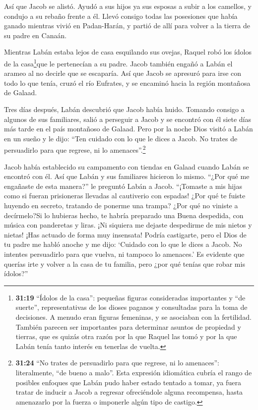  Así que Jacob se alistó. Ayudó a sus hijos ya sus esposas
a subir a los camellos,  y condujo a su rebaño frente a él.
Llevó consigo todas las posesiones que había ganado mientras vivió en
Padan-Harán, y partió de allí para volver a la tierra de su padre en
Canaán.

 Mientras Labán estaba lejos de casa esquilando sus ovejas,
Raquel robó los ídolos de la casa\footnote{\textbf{31:19} ``Ídolos de la
  casa'': pequeñas figuras consideradas importantes y ``de suerte'',
  representativas de los dioses paganos y consultadas para la toma de
  decisiones. A menudo eran figuras femeninas, y se asociaban con la
  fertilidad. También parecen ser importantes para determinar asuntos de
  propiedad y tierras, que es quizás otra razón por la que Raquel las
  tomó y por la que Labán tenía tanto interés en tenerlas de vuelta.}que
le pertenecían a su padre.  Jacob también engañó a Labán el
arameo al no decirle que se escaparía.  Así que Jacob se
apresuró para irse con todo lo que tenía, cruzó el río Eufrates, y se
encaminó hacia la región montañosa de Galaad.

 Tres días después, Labán descubrió que Jacob había huido.
 Tomando consigo a algunos de sus familiares, salió a
perseguir a Jacob y se encontró con él siete días más tarde en el país
montañoso de Galaad.  Pero por la noche Dios visitó a Labán
en un sueño y le dijo: ``Ten cuidado con lo que le dices a Jacob. No
trates de persuadirlo para que regrese, ni lo amenaces''.\footnote{\textbf{31:24}
  ``No trates de persuadirlo para que regrese, ni lo amenaces'':
  literalmente, ``de bueno a malo''. Esta expresión idiomática cubría el
  rango de posibles enfoques que Labán pudo haber estado tentado a
  tomar, ya fuera tratar de inducir a Jacob a regresar ofreciéndole
  alguna recompensa, hasta amenazarlo por la fuerza o imponerle algún
  tipo de castigo.}

 Jacob había establecido su campamento con tiendas en
Galaad cuando Labán se encontró con él. Así que Labán y sus familiares
hicieron lo mismo.  ``¿Por qué me engañaste de esta
manera?'' le preguntó Labán a Jacob. ``¡Tomaste a mis hijas como si
fueran prisioneras llevadas al cautiverio con espadas! 
¿Por qué te fuiste huyendo en secreto, tratando de ponerme una trampa?
¿Por qué no viniste a decírmelo?Si lo hubieras hecho, te habría
preparado una Buena despedida, con música con panderetas y liras.
 ¡Ni siquiera me dejaste despedirme de mis nietos y nietas!
¡Has actuado de forma muy insensata!  Podría castigarte,
pero el Dios de tu padre me habló anoche y me dijo: `Cuidado con lo que
le dices a Jacob. No intentes persuadirlo para que vuelva, ni tampoco lo
amenaces.'  Es evidente que querías irte y volver a la casa
de tu familia, pero ¿por qué tenías que robar mis ídolos?''

